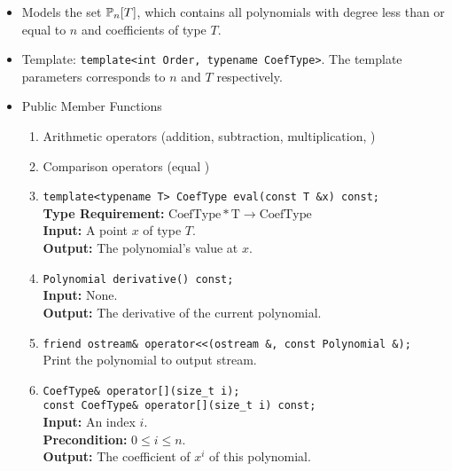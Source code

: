\documentclass[12pt]{article}
\begin{document}
    \begin{itemize}
        \item Models the set \(\mathbb {P}_n[T]\), which contains all polynomials 
              with degree less than or equal to \(n\) and coefficients of type \(T\).
        \item Template: \texttt{template<int Order, typename CoefType>}. The template parameters
              corresponds to \(n\) and \(T\) respectively.
        \item Public Member Functions
              \begin{enumerate}
                  \item Arithmetic operators (addition, subtraction, multiplication, )
                  \item Comparison operators (equal )
                  \item \texttt{template<typename T> CoefType eval(const T \&x) const;} \\
                        \textbf{Type Requirement:} \(\text{CoefType}*\text{T}\to \text{CoefType}\) \\
                        \textbf{Input:} A point \(x\) of type \(T\). \\
                        \textbf{Output:} The polynomial's value at \(x\).
                  \item \texttt{Polynomial derivative() const;} \\
                        \textbf{Input:} None. \\
                        \textbf{Output:} The derivative of the current polynomial.
                  \item \texttt{friend ostream\& operator<<(ostream \&, const Polynomial \&);} \\
                        Print the polynomial to output stream.
                  \item \texttt{CoefType\& operator[](size\_t i);} \\
                        \texttt{const CoefType\& operator[](size\_t i) const;} \\
                        \textbf{Input:} An index \(i\). \\
                        \textbf{Precondition:} \(0\le i\le n\). \\
                        \textbf{Output:} The coefficient of \(x^i\) of this polynomial.
              \end{enumerate}
    \end{itemize}
\end{document}
